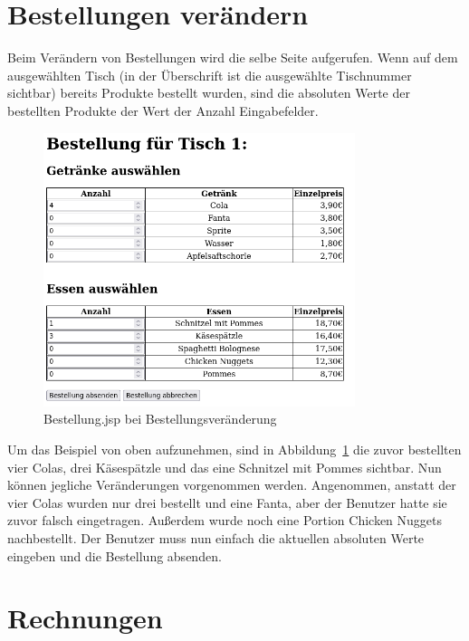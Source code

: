 
\section{Bestellungen verändern} %
\label{sec:Bestellungen verändern}

Beim Verändern von Bestellungen wird die selbe Seite aufgerufen.
Wenn auf dem ausgewählten Tisch (in der Überschrift ist die ausgewählte Tischnummer sichtbar) bereits Produkte bestellt wurden, sind die absoluten Werte der bestellten Produkte der Wert der Anzahl Eingabefelder.

\begin{figure}[htb]
  \centering
  \includegraphics[height=8cm]{images/ChangeBestellungJSP.png}
  \caption[Bestellung.jsp bei Bestellungsveränderung]{Bestellung.jsp bei Bestellungsveränderung}
  \label{abb:ChangeBestellungJSP}
\end{figure}

Um das Beispiel von oben aufzunehmen, sind in Abbildung~\ref{abb:ChangeBestellungJSP} die zuvor bestellten vier Colas, drei Käsespätzle und das eine Schnitzel mit Pommes sichtbar.
Nun können jegliche Veränderungen vorgenommen werden.
Angenommen, anstatt der vier Colas wurden nur drei bestellt und eine Fanta, aber der Benutzer hatte sie zuvor falsch eingetragen.
Außerdem wurde noch eine Portion Chicken Nuggets nachbestellt.
Der Benutzer muss nun einfach die aktuellen absoluten Werte eingeben und die Bestellung absenden.


\section{Rechnungen} %
\label{sec:Rechnungen}

